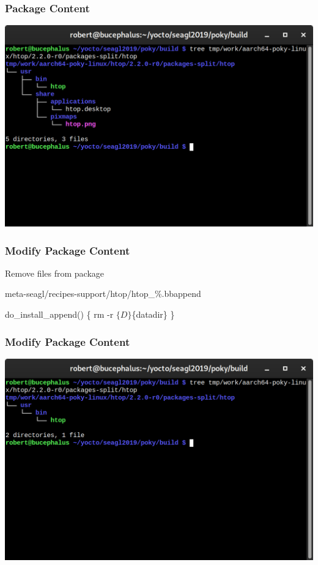 \documentclass[aspectratio=169]{beamer}
\begin{document}
\begin{frame}
\frametitle{Package Content}
\begin{center}
	\includegraphics[width=\textwidth,height=0.9\textheight,keepaspectratio]{images/htop-packages-split-before.png}
\end{center}
\end{frame}

\begin{frame}[fragile]
\frametitle{Modify Package Content}
Remove files from package
\begin{block}{meta-seagl/recipes-support/htop/htop\_\%.bbappend}
\begin{semiverbatim}
do\_install\_append() \{
    rm -r $\{D\}$\{datadir\}
\}
\end{semiverbatim}
\end{block}
\end{frame}

\begin{frame}
\frametitle{Modify Package Content}
\begin{center}
	\includegraphics[width=\textwidth,height=0.9\textheight,keepaspectratio]{images/htop-packages-split-after.png}
\end{center}
\end{frame}
\end{document}
